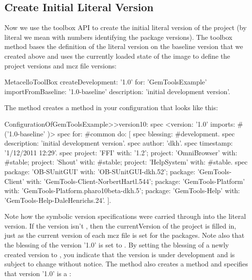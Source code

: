 \documentclass[a4paper,10pt,twoside]{book}
\begin{document}
\subsection{Create Initial Literal Version}

Now we use the toolbox API to create the initial literal version of the project (by literal we mean with numbers identifying the package versions). The toolbox method  bases the definition of the literal version on the baseline version that we created above and uses the currently loaded state of the image to define the project versions and mcz file versions:

\begin{code}{}
  MetacelloToolBox
     createDevelopment: '1.0'
     for: 'GemToolsExample'
     importFromBaseline: '1.0-baseline'
     description: 'initial development version'.
\end{code}

The  method creates a  method in your configuration that looks like this:

\begin{code}{}
ConfigurationOfGemToolsExample>>version10: spec
  <version: '1.0' imports: #('1.0-baseline' )>
  spec for: #common do: [
     spec blessing: #development.
     spec description: 'initial development version'.
     spec author: 'dkh'.
     spec timestamp: '1/12/2011 12:29'.
     spec 
        project: 'FFI' with: '1.2';
        project: 'OmniBrowser' with: #stable;
        project: 'Shout' with: #stable;
        project: 'HelpSystem' with: #stable.
     spec
        package: 'OB-SUnitGUI' with: 'OB-SUnitGUI-dkh.52';
        package: 'GemTools-Client' with: 'GemTools-Client-NorbertHartl.544';
        package: 'GemTools-Platform' with: 'GemTools-Platform.pharo10beta-dkh.5';
        package: 'GemTools-Help' with: 'GemTools-Help-DaleHenrichs.24'. ].
\end{code}

Note how the  symbolic version specifications were carried through into the literal version. If the version isn't , then the currentVersion of the project is filled in, just as the current version of each mcz file is set for the packages. Note also that the blessing of the version '1.0' is set to . By setting the blessing of a newly created version to , you indicate that the version is under development and is subject to change without notice. The  method also creates a  method and specifies that version '1.0' is a :
\end{document}

